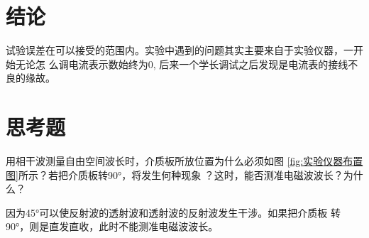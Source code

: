 \documentclass[../main]{subfiles}
\begin{document}
\section{结论}%
\label{sec:\arabic{chapter}结论}

试验误差在可以接受的范围内。实验中遇到的问题其实主要来自于实验仪器，一开始无论怎
么调电流表示数始终为0, 后来一个学长调试之后发现是电流表的接线不良的缘故。

\section{思考题}%
\label{sec:\arabic{chapter}思考题}

\begin{Exercise}

	用相干波测量自由空间波长时，介质板所放位置为什么必须如图
	\ref{fig:实验仪器布置图}所示？若把介质板转\ang{90;;}，将发生何种现象
	？这时，能否测准电磁波波长？为什么？

\end{Exercise}

\begin{Answer}

	因为\ang{45;;}可以使反射波的透射波和透射波的反射波发生干涉。如果把介质板
	转\ang{90;;}，则是直发直收，此时不能测准电磁波波长。

\end{Answer}
\end{document}
